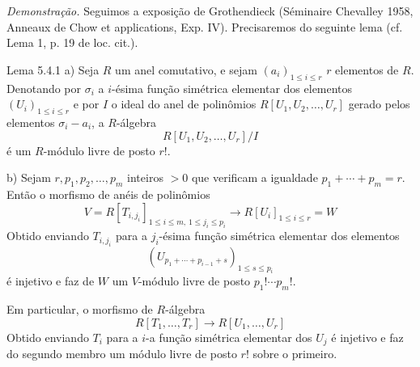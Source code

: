 \emph{Demonstração.} Seguimos a exposição de Grothendieck (Séminaire Chevalley 1958, Anneaux de Chow et applications, Exp. IV). Precisaremos do seguinte lema (cf. Lema 1, p. 19 de loc. cit.).

\begin{statement}{Lema 5.4.1}
a) Seja $R$ um anel comutativo, e sejam $(a_i)_{1\le i\le r}$ $r$ elementos de $R$. Denotando por $\sigma_i$ a $i$-ésima função simétrica elementar dos elementos $(U_i)_{1\le i\le r}$ e por $I$ o ideal do anel de polinômios $R[U_1,U_2,\ldots,U_r]$ gerado pelos elementos $\sigma_i-a_i$, a $R$-álgebra
\[
R[U_1,U_2,\ldots,U_r]/I
\]
é um $R$-módulo livre de posto $r!$.

b) Sejam $r,p_1,p_2,\ldots,p_m$ inteiros $>0$ que verificam a igualdade $p_1+\cdots+p_m=r$. Então o morfismo de anéis de polinômios
\[
V=R[T_{i,j_i}]_{1\le i\le m,\,1\le j_i\le p_i}
\longrightarrow R[U_i]_{1\le i\le r}=W
\]
Obtido enviando $T_{i,j_i}$ para a $j_i$-ésima função simétrica elementar dos elementos
\[
(U_{p_1+\cdots+p_{i-1}+s})_{1\le s\le p_i}
\]
é injetivo e faz de $W$ um $V$-módulo livre de posto $p_1!\cdots p_m!$.

Em particular, o morfismo de $R$-álgebra
\[
R[T_1,\ldots,T_r]\to R[U_1,\ldots,U_r]
\]
Obtido enviando $T_i$ para a $i$-a função simétrica elementar dos $U_j$ é injetivo e faz do segundo membro um módulo livre de posto $r!$ sobre o primeiro.
\end{statement}
